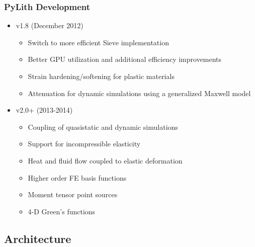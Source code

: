 \documentclass{beamer}
\begin{document}
\begin{frame}
  \frametitle{PyLith Development}

  \begin{itemize}
 \item v1.8 (December 2012)
    \begin{itemize}
    \item Switch to more efficient Sieve implementation
    \item Better GPU utilization and additional efficiency improvements
    \item Strain hardening/softening for plastic materials
    \item Attenuation for dynamic simulations using a generalized Maxwell model
    \end{itemize}
  \item v2.0+ (2013-2014)
    \begin{itemize}
    \item Coupling of quasistatic and dynamic simulations
    \item Support for incompressible elasticity
    \item Heat and fluid flow coupled to elastic deformation
    \item Higher order FE basis functions
    \item Moment tensor point sources
    \item 4-D Green's functions
   \end{itemize}
  \end{itemize}

\end{frame}


\subsection{Architecture}
\end{document}
